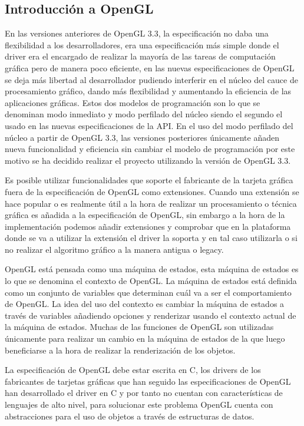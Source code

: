 \documentclass[a4paper, 17pt]{book}
\begin{document}
\subsection{Introducción a OpenGL} 
\label{subsec:IntroOpenGL}

En las versiones anteriores de OpenGL 3.3, la especificación no daba una flexibilidad a los desarrolladores, era una
especificación más simple donde el driver era el encargado de realizar la mayoría de las tareas de computación
gráfica pero de manera poco eficiente, en las nuevas especificaciones de OpenGL se deja más libertad al desarrollador
pudiendo interferir en el núcleo del cauce de procesamiento gráfico, dando más flexibilidad y aumentando la eficiencia
de las aplicaciones gráficas. Estos dos modelos de programación son lo que se denominan modo inmediato y modo perfilado
del núcleo siendo el segundo el usado en las nuevas especificaciones de la API. En el uso del modo perfilado del núcleo
a partir de OpenGL 3.3, las versiones posteriores únicamente añaden nueva funcionalidad y eficiencia sin cambiar el
modelo de programación por este motivo se ha decidido realizar el proyecto utilizando la versión de OpenGL 3.3.

Es posible utilizar funcionalidades que soporte el fabricante de la tarjeta gráfica fuera de la especificación de OpenGL
como extensiones. Cuando una extensión se hace popular o es realmente útil a la hora de realizar un procesamiento o
técnica gráfica es añadida a la especificación de OpenGL, sin embargo a la hora de la implementación podemos añadir
extensiones y comprobar que en la plataforma donde se va a utilizar la extensión el driver la soporta y en tal caso
utilizarla o si no realizar el algoritmo gráfico a la manera antigua o legacy.

OpenGL está pensada como una máquina de estados, esta máquina de estados es lo que se denomina el contexto de OpenGL.
La máquina de estados está definida como un conjunto de variables que determinan cuál va a ser el comportamiento de OpenGL.
La idea del uso del contexto es cambiar la máquina de estados a través de variables añadiendo opciones y renderizar usando
el contexto actual de la máquina de estados. Muchas de las funciones de OpenGL son utilizadas únicamente para realizar un
cambio en la máquina de estados de la que luego beneficiarse a la hora de realizar la renderización de los objetos.

La especificación de OpenGL debe estar escrita en C, los drivers de los fabricantes de tarjetas gráficas que han seguido
las especificaciones de OpenGL han desarrollado el driver en C y por tanto no cuentan con características de lenguajes
de alto nivel, para solucionar este problema OpenGL cuenta con abstracciones para el uso de objetos a través de estructuras de datos.
\end{document}
